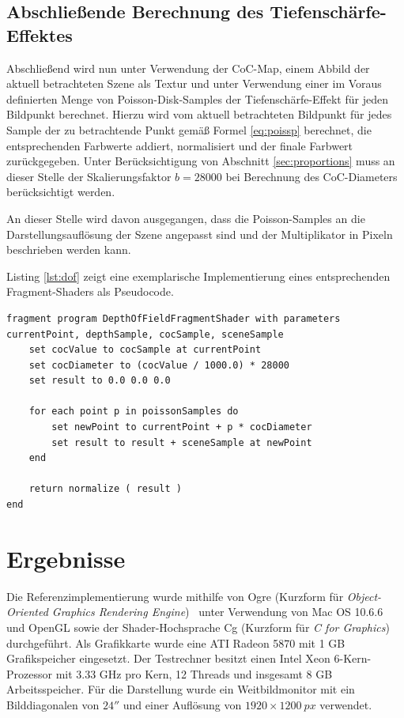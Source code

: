 \documentclass{acmsiggraph}                     %
\begin{document}
\subsection{Abschließende Berechnung des Tiefenschärfe-Effektes}

Abschließend wird nun unter Verwendung der CoC-Map, einem Abbild der aktuell betrachteten Szene als Textur und unter Verwendung einer im Voraus definierten Menge von Poisson-Disk-Samples der Tiefenschärfe-Effekt für jeden Bildpunkt berechnet. Hierzu wird vom aktuell betrachteten Bildpunkt für jedes Sample der zu betrachtende Punkt gemäß Formel \ref{eq:poissp} berechnet, die entsprechenden Farbwerte addiert, normalisiert und der finale Farbwert zurückgegeben. Unter Berücksichtigung von Abschnitt \ref{sec:proportions} muss an dieser Stelle der Skalierungsfaktor $b = 28000$ bei Berechnung des CoC-Diameters berücksichtigt werden.

An dieser Stelle wird davon ausgegangen, dass die Poisson-Samples an die Darstellungsauflösung der Szene angepasst sind und der Multiplikator in Pixeln beschrieben werden kann.

Listing \ref{lst:dof} zeigt eine exemplarische Implementierung eines entsprechenden Fragment-Shaders als Pseudocode.

\begin{lstlisting}[caption=Pseudocode für den Fragment-Shader zur Berechnung der Tiefenschärfe.,language=pseudo,label={lst:dof}]
fragment program DepthOfFieldFragmentShader with parameters currentPoint, depthSample, cocSample, sceneSample
	set cocValue to cocSample at currentPoint
	set cocDiameter to (cocValue / 1000.0) * 28000
	set result to 0.0 0.0 0.0

	for each point p in poissonSamples do
		set newPoint to currentPoint + p * cocDiameter
		set result to result + sceneSample at newPoint
	end
	
	return normalize ( result )
end
\end{lstlisting}

\section{Ergebnisse}

Die Referenzimplementierung wurde mithilfe von Ogre (Kurzform für \emph{Object-Oriented Graphics Rendering Engine})~\cite{Torus:2011vn} unter Verwendung von Mac OS 10.6.6 und OpenGL sowie der Shader-Hochsprache Cg (Kurzform für \emph{C for Graphics}) durchgeführt. Als Grafikkarte wurde eine ATI Radeon 5870 mit 1 GB Grafikspeicher eingesetzt. Der Testrechner besitzt einen Intel Xeon 6-Kern-Prozessor mit 3.33 GHz pro Kern, 12 Threads und insgesamt 8 GB Arbeitsspeicher. Für die Darstellung wurde ein Weitbildmonitor mit ein Bilddiagonalen von $24''$ und einer Auflösung von $1920\times\SI{1200}{px}$ verwendet.
\end{document}
